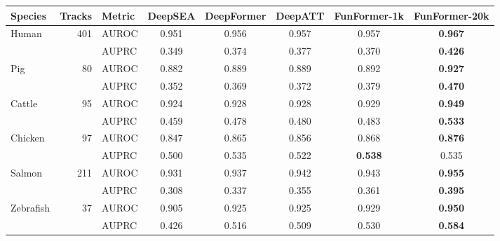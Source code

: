 \begin{tabular}{l r l c c c c c }
\toprule
Species & Tracks & Metric & DeepSEA & DeepFormer & DeepATT & FunFormer-1k & FunFormer-20k \\
\midrule
Human & 401 & AUROC & 0.951 & 0.956 & 0.957 & 0.957 & \textbf{0.967} \\
 & & AUPRC & 0.349 & 0.374 & 0.377 & 0.370 & \textbf{0.426} \\
\addlinespace
Pig & 80 & AUROC & 0.882 & 0.889 & 0.889 & 0.892 & \textbf{0.927} \\
 & & AUPRC & 0.352 & 0.369 & 0.372 & 0.379 & \textbf{0.470} \\
\addlinespace
Cattle & 95 & AUROC & 0.924 & 0.928 & 0.928 & 0.929 & \textbf{0.949} \\
 & & AUPRC & 0.459 & 0.478 & 0.480 & 0.483 & \textbf{0.533} \\
\addlinespace
Chicken & 97 & AUROC & 0.847 & 0.865 & 0.856 & 0.868 & \textbf{0.876} \\
 & & AUPRC & 0.500 & 0.535 & 0.522 & \textbf{0.538} & 0.535 \\
\addlinespace
Salmon & 211 & AUROC & 0.931 & 0.937 & 0.942 & 0.943 & \textbf{0.955} \\
 & & AUPRC & 0.308 & 0.337 & 0.355 & 0.361 & \textbf{0.395} \\
\addlinespace
Zebrafish & 37 & AUROC & 0.905 & 0.925 & 0.925 & 0.929 & \textbf{0.950} \\
 & & AUPRC & 0.426 & 0.516 & 0.509 & 0.530 & \textbf{0.584} \\
\bottomrule
\end{tabular}
